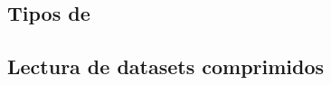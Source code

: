 




\subsection{Tipos de \transacciones}
\label{sec:clasificacion:transacciones-tipo-ii:tipos-de-transacciones}





\subsection{Lectura de datasets comprimidos}
\label{sec:clasificacion:transacciones-tipo-ii:lectura}


